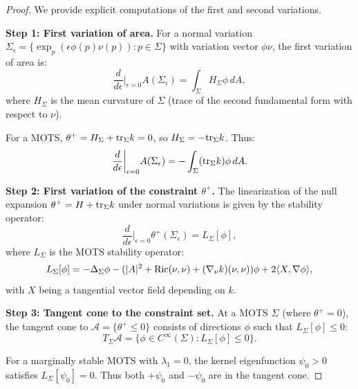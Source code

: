 \begin{proof}
We provide explicit computations of the first and second variations.

\textbf{Step 1: First variation of area.}
For a normal variation $\Sigma_\epsilon = \{\exp_p(\epsilon \phi(p) \nu(p)) : p \in \Sigma\}$ with variation vector $\phi \nu$, the first variation of area is:
\begin{equation}\label{eq:FirstVarArea}
    \frac{d}{d\epsilon}\bigg|_{\epsilon=0} A(\Sigma_\epsilon) = \int_\Sigma H_\Sigma \phi \, dA,
\end{equation}
where $H_\Sigma$ is the mean curvature of $\Sigma$ (trace of the second fundamental form with respect to $\nu$).

For a MOTS, $\theta^+ = H_\Sigma + \mathrm{tr}_\Sigma k = 0$, so $H_\Sigma = -\mathrm{tr}_\Sigma k$. Thus:
\begin{equation}\label{eq:FirstVarMOTS}
    \frac{d}{d\epsilon}\bigg|_{\epsilon=0} A(\Sigma_\epsilon) = -\int_\Sigma (\mathrm{tr}_\Sigma k) \phi \, dA.
\end{equation}

\textbf{Step 2: First variation of the constraint $\theta^+$.}
The linearization of the null expansion $\theta^+ = H + \mathrm{tr}_\Sigma k$ under normal variations is given by the stability operator:
\begin{equation}\label{eq:ThetaLinearization}
    \frac{d}{d\epsilon}\bigg|_{\epsilon=0} \theta^+(\Sigma_\epsilon) = L_\Sigma[\phi],
\end{equation}
where $L_\Sigma$ is the MOTS stability operator:
\begin{equation}\label{eq:StabilityOpDef}
    L_\Sigma[\phi] = -\Delta_\Sigma \phi - (|A|^2 + \mathrm{Ric}(\nu,\nu) + (\nabla_\nu k)(\nu,\nu))\phi + 2\langle X, \nabla \phi \rangle,
\end{equation}
with $X$ being a tangential vector field depending on $k$.

\textbf{Step 3: Tangent cone to the constraint set.}
At a MOTS $\Sigma$ (where $\theta^+ = 0$), the tangent cone to $\mathcal{A} = \{\theta^+ \le 0\}$ consists of directions $\phi$ such that $L_\Sigma[\phi] \le 0$:
\begin{equation}\label{eq:TangentCone}
    T_\Sigma \mathcal{A} = \{\phi \in C^\infty(\Sigma) : L_\Sigma[\phi] \le 0\}.
\end{equation}

For a marginally stable MOTS with $\lambda_1 = 0$, the kernel eigenfunction $\psi_0 > 0$ satisfies $L_\Sigma[\psi_0] = 0$. Thus both $+\psi_0$ and $-\psi_0$ are in the tangent cone.


\end{proof}
